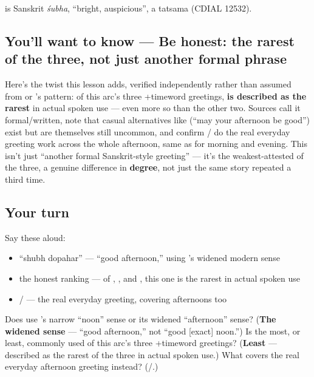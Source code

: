 \textbf{} is Sanskrit \emph{śubha}, \textquotedblleft{}bright, auspicious\textquotedblright{}, a tatsama (CDIAL 12532).

\subsection*{You'll want to know — Be honest: the rarest of the three, not just another formal phrase}
Here's the twist this lesson adds, verified independently rather than assumed from  or  's pattern: of this arc's three +timeword greetings, \textbf{  is described as the rarest} in actual spoken use — even more so than the other two. Sources call it formal/written, note that casual alternatives like \textbf{   } (\textquotedblleft{}may your afternoon be good\textquotedblright{}) exist but are themselves still uncommon, and confirm \textbf{}/\textbf{} do the real everyday greeting work across the whole afternoon, same as for morning and evening. This isn't just \textquotedblleft{}another formal Sanskrit-style greeting\textquotedblright{} — it's the weakest-attested of the three, a genuine difference in \textbf{degree}, not just the same story repeated a third time.

\subsection*{Your turn}
Say these aloud:

\begin{itemize}
\raggedright
  \item \textquotedblleft{}shubh dopahar\textquotedblright{} — \textquotedblleft{}good afternoon,\textquotedblright{} using 's widened modern sense
  \item the honest ranking — of ,  , and  , this one is the rarest in actual spoken use
  \item {}/ — the real everyday greeting, covering afternoons too
\end{itemize}

\begin{tcolorbox}[breakable,colback=teal!4,colframe=teal!35!black,title={Before you move on}]
Does   use 's narrow \textquotedblleft{}noon\textquotedblright{} sense or its widened \textquotedblleft{}afternoon\textquotedblright{} sense? (\textbf{The widened sense} — \textquotedblleft{}good afternoon,\textquotedblright{} not \textquotedblleft{}good {[}exact{]} noon.\textquotedblright{}) Is   the most, or least, commonly used of this arc's three +timeword greetings? (\textbf{Least} — described as the rarest of the three in actual spoken use.) What covers the real everyday afternoon greeting instead? (\textbf{}/\textbf{}.)
\end{tcolorbox}
